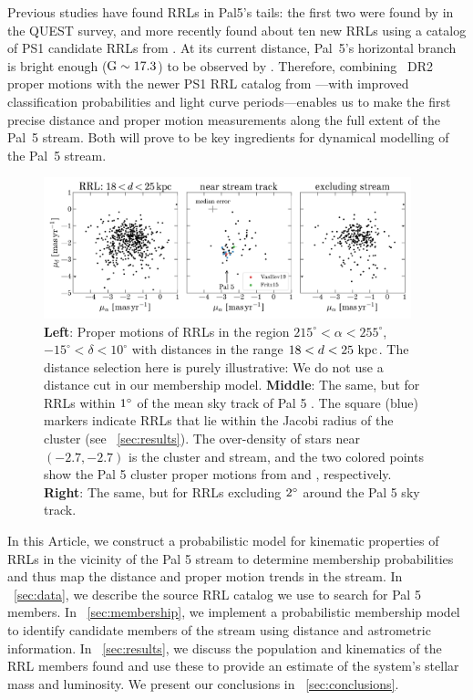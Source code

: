 \documentclass[twocolumn]{aastex63}
\begin{document}
Previous studies have found RRLs in Pal5's tails: the first two were found by \citet{Vivas:2001} in the QUEST survey, and more recently \citep{Ibata:2017} found about ten new RRLs using a catalog of PS1 candidate RRLs from \citet{Hernitschek:2016}. At its current distance, Pal~5's horizontal branch is bright enough (${\mathrm{G}}\sim17.3$) to be observed by \Gaia. Therefore, combining \Gaia~DR2 proper motions with the newer PS1 RRL catalog from \citet{Sesar:2017b}---with improved classification probabilities and light curve periods---enables us to make the first precise distance and proper motion measurements along the full extent of the Pal~5 stream. Both will prove to be key ingredients for dynamical modelling of the Pal~5 stream.

\begin{figure}[t!]
\begin{center}
\includegraphics[width=0.95\textwidth, trim=0 20px 0 0]{proper-motion.pdf}
\caption{\textbf{Left}: Proper motions of RRLs in the region $215^\circ < \alpha < 255^\circ$, $-15^\circ < \delta < 10^\circ$ with distances in the range $18 < d < 25~\mathrm{kpc}$.
The distance selection here is purely illustrative: We do not use a distance cut in our membership model.
\textbf{Middle}: The same, but for RRLs within $1\mbox{$^\circ$}$ of the mean sky track of Pal 5 \citep{Bonaca:2019}.
The square (blue) markers indicate RRLs that lie within the Jacobi radius of the cluster (see \sectionname~\ref{sec:results}).
The over-density of stars near $(-2.7, -2.7)$ is the cluster and stream, and the two colored points show the Pal 5 cluster proper motions from \citet{Vasiliev:2019} and \citet{Fritz:2015}, respectively.
\textbf{Right}: The same, but for RRLs excluding $2\mbox{$^\circ$}$ around the Pal 5 sky track.}
\label{fig:pm}
\end{center}
\end{figure}

In this Article, we construct a probabilistic model for kinematic properties of RRLs in the vicinity of the Pal 5 stream to determine membership probabilities and thus map the distance and proper motion trends in the stream.
In \sectionname~\ref{sec:data}, we describe the source RRL catalog we use to search for Pal 5 members.
In \sectionname~\ref{sec:membership}, we implement a probabilistic membership model to identify candidate members of the stream using distance and astrometric information.
In \sectionname~\ref{sec:results}, we discuss the population and kinematics of the RRL members found and use these to provide an estimate of the system's stellar mass and luminosity.
We present our conclusions in \sectionname~\ref{sec:conclusions}.
\end{document}
